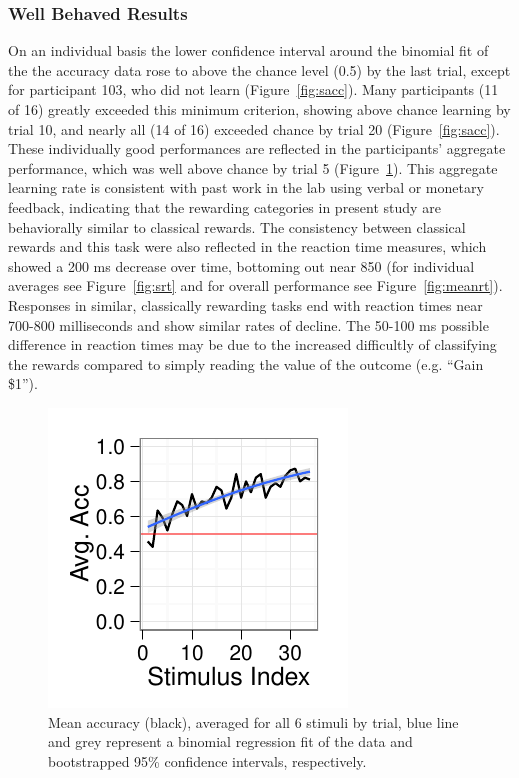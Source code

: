 \documentclass[doc,12pt]{apa}        %
\begin{document}
\subsubsection{Well Behaved Results}
On an individual basis the lower confidence interval around the binomial fit of the the accuracy data rose to above the chance level (0.5) by the last trial, except for participant 103, who did not learn (Figure~\ref{fig:sacc}).  Many participants (11 of 16) greatly exceeded this minimum criterion, showing above chance learning by trial 10, and nearly all (14 of 16) exceeded chance by trial 20  (Figure~\ref{fig:sacc}).  These individually good performances are reflected in the participants' aggregate performance, which was well above chance by trial 5 (Figure~\ref{fig:meanacc}).  This aggregate learning rate is consistent with past work in the lab using verbal or monetary feedback, indicating that the rewarding categories in present study are behaviorally similar to classical rewards.  The consistency between classical rewards and this task were also reflected in the reaction time measures, which showed a 200 ms decrease over time, bottoming out near 850 (for individual averages see Figure~\ref{fig:srt} and for overall performance see Figure~\ref{fig:meanrt}).  Responses in similar, classically rewarding tasks end with reaction times near 700-800 milliseconds and show similar rates of decline.  The 50-100 ms possible difference in reaction times may be due to the increased difficultly of classifying the rewards compared to simply reading the value of the outcome (e.g. ``Gain \$1'').

\begin{figure}[tp]
	\includegraphics{f_all_mean_acc}
    \centering
	\caption{Mean accuracy (black), averaged for all 6 stimuli by trial, blue line and grey represent a binomial regression fit of the data and bootstrapped 95\% confidence intervals, respectively.}
	\label{fig:meanacc}
\end{figure}
\end{document}
